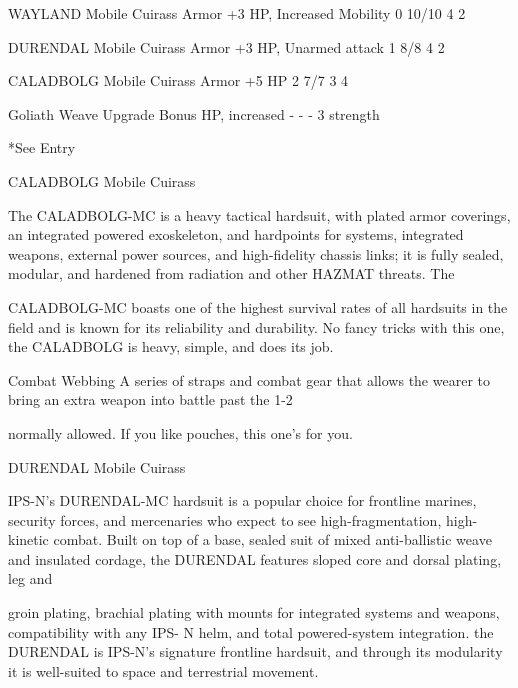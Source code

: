   WAYLAND Mobile Cuirass               Armor         +3 HP, Increased Mobility      0         10/10         4      2 

 DURENDAL Mobile Cuirass               Armor         +3 HP, Unarmed attack          1         8/8           4      2 

 CALADBOLG Mobile Cuirass              Armor         +5 HP                          2         7/7           3      4 

 Goliath Weave                         Upgrade       Bonus HP, increased            -         -             -      3 
                                                    strength 

*See Entry
 

CALADBOLG Mobile Cuirass  

The CALADBOLG-MC is a heavy tactical hardsuit, with plated armor coverings, an integrated powered  
exoskeleton, and hardpoints for systems, integrated weapons, external power sources, and high-fidelity  
chassis links; it is fully sealed, modular, and hardened from radiation and other HAZMAT threats. The  

CALADBOLG-MC boasts one of the highest survival rates of all hardsuits in the field and is known for its  
reliability and durability. No fancy tricks with this one, the CALADBOLG is heavy, simple, and does its job.     

Combat Webbing  
A series of straps and combat gear that allows the wearer to bring an extra weapon into battle past the 1-2  

normally allowed. If you like pouches, this one’s for you. 
 

DURENDAL Mobile Cuirass  

IPS-N’s DURENDAL-MC hardsuit is a popular choice for frontline marines, security forces, and mercenaries  
who expect to see high-fragmentation, high-kinetic combat. Built on top of a base, sealed suit of mixed  
anti-ballistic weave and insulated cordage, the DURENDAL features sloped core and dorsal plating, leg and  

                                                                                                                       


groin plating, brachial plating with mounts for integrated systems and weapons, compatibility with any IPS- 
N helm, and total powered-system integration. the DURENDAL is IPS-N’s signature frontline hardsuit, and  
through its modularity it is well-suited to space and terrestrial movement.        

